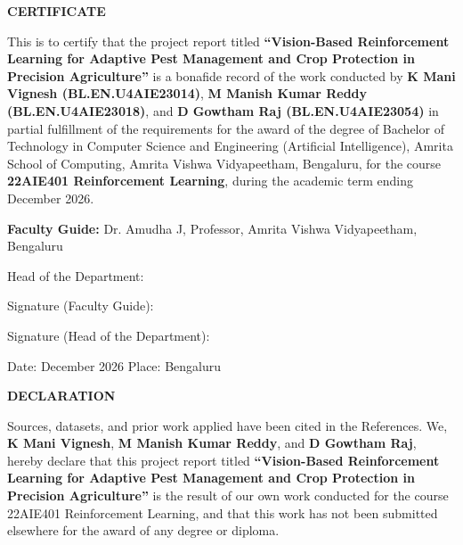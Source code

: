 \documentclass[12pt,a4paper]{report}
\begin{document}
\setcounter{page}{1}

\newpage
\begin{center}
{\Large\bfseries CERTIFICATE\par}
\end{center}
\vspace{1cm}
This is to certify that the project report titled \textbf{“Vision-Based Reinforcement Learning for Adaptive Pest Management and Crop Protection in Precision Agriculture”} is a bonafide record of the work conducted by \textbf{K Mani Vignesh (BL.EN.U4AIE23014)}, \textbf{M Manish Kumar Reddy (BL.EN.U4AIE23018)}, and \textbf{D Gowtham Raj (BL.EN.U4AIE23054)} in partial fulfillment of the requirements for the award of the degree of Bachelor of Technology in Computer Science and Engineering (Artificial Intelligence), Amrita School of Computing, Amrita Vishwa Vidyapeetham, Bengaluru, for the course \textbf{22AIE401 Reinforcement Learning}, during the academic term ending December 2026.

\vspace{1.5cm}
\noindent\textbf{Faculty Guide:} Dr. Amudha J, Professor, Amrita Vishwa Vidyapeetham, Bengaluru\par
\vspace{1.0cm}
\noindent Head of the Department: \hrulefill\par
\vspace{1.0cm}
\noindent Signature (Faculty Guide): \hrulefill\par
\vspace{1.0cm}
\noindent Signature (Head of the Department): \hrulefill\par
\vspace{1.0cm}
\noindent Date: December 2026 \hfill Place: Bengaluru

\newpage
\begin{center}
{\Large\bfseries DECLARATION\par}
\end{center}
\vspace{1cm}
Sources, datasets, and prior work applied have been cited in the References. We, \textbf{K Mani Vignesh}, \textbf{M Manish Kumar Reddy}, and \textbf{D Gowtham Raj}, hereby declare that this project report titled \textbf{“Vision-Based Reinforcement Learning for Adaptive Pest Management and Crop Protection in Precision Agriculture”} is the result of our own work conducted for the course 22AIE401 Reinforcement Learning, and that this work has not been submitted elsewhere for the award of any degree or diploma.
\end{document}

